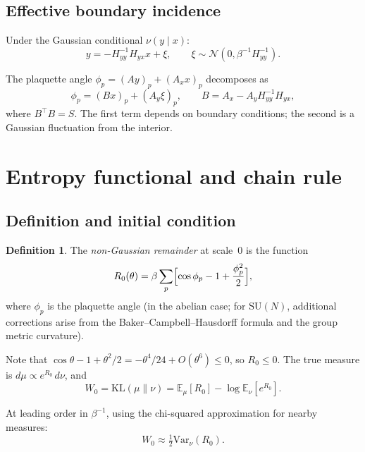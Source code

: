 \documentclass[11pt]{article}
\theoremstyle{definition}
\newtheorem{definition}[theorem]{Definition}
\newcommand{\KL}{\mathrm{KL}}
\newcommand{\Var}{\mathrm{Var}}
\newcommand{\E}{\mathbb{E}}
\begin{document}
\subsection{Effective boundary incidence}

Under the Gaussian conditional $\nu(y \mid x)$:
\[
  y = -H_{yy}^{-1} H_{yx} x + \xi, \qquad 
  \xi \sim \mathcal{N}(0, \beta^{-1} H_{yy}^{-1}).
\]

The plaquette angle $\phi_p = (Ay)_p + (A_x x)_p$ decomposes as
\[
  \phi_p = (Bx)_p + (A_y \xi)_p, \qquad 
  B = A_x - A_y H_{yy}^{-1} H_{yx},
\]
where $B^\top B = S$.  The first term depends on boundary 
conditions; the second is a Gaussian fluctuation from the interior.


\section{Entropy functional and chain rule}\label{sec:entropy}

\subsection{Definition and initial condition}

\begin{definition}
The \emph{non-Gaussian remainder} at scale~0 is the function
\[
  R_0(\theta) = \beta \sum_p \Bigl[\cos\phi_p - 1 + \frac{\phi_p^2}{2}\Bigr],
\]
where $\phi_p$ is the plaquette angle (in the abelian case; for 
$\mathrm{SU}(N)$, additional corrections arise from the Baker--Campbell--Hausdorff 
formula and the group metric curvature).

Note that $\cos\theta - 1 + \theta^2/2 = -\theta^4/24 + O(\theta^6) \leq 0$, 
so $R_0 \leq 0$.  The true measure is 
$d\mu \propto e^{R_0}\,d\nu$, and
\[
  W_0 = \KL(\mu \| \nu) = \E_\mu[R_0] - \log\E_\nu[e^{R_0}].
\]
\end{definition}

At leading order in $\beta^{-1}$, using the chi-squared approximation 
for nearby measures:
\[
  W_0 \approx \tfrac{1}{2} \Var_\nu(R_0).
\]
\end{document}
